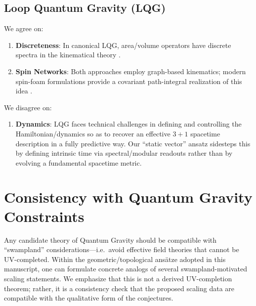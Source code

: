 \subsection{Loop Quantum Gravity (LQG)}
We agree on:
\begin{enumerate}
    \item \textbf{Discreteness}: In canonical LQG, area/volume operators have discrete spectra in the kinematical theory \cite{RovelliSmolin1995,AshtekarLewandowski1997Area}.
    \item \textbf{Spin Networks}: Both approaches employ graph-based kinematics; modern spin-foam formulations provide a covariant path-integral realization of this idea \cite{Perez2013SpinFoam}.
\end{enumerate}
We disagree on:
\begin{enumerate}
    \item \textbf{Dynamics}: LQG faces technical challenges in defining and controlling the Hamiltonian/dynamics so as to recover an effective $3{+}1$ spacetime description in a fully predictive way. Our ``static vector'' ansatz sidesteps this by defining intrinsic time via spectral/modular readouts rather than by evolving a fundamental spacetime metric.
\end{enumerate}



\section{Consistency with Quantum Gravity Constraints}
\label{chap:swampland}

Any candidate theory of Quantum Gravity should be compatible with ``swampland'' considerations---i.e.\ avoid effective field theories that cannot be UV-completed. Within the geometric/topological ans\"atze adopted in this manuscript, one can formulate concrete analogs of several swampland-motivated scaling statements. We emphasize that this is not a derived UV-completion theorem; rather, it is a consistency check that the proposed scaling data are compatible with the qualitative form of the conjectures.

